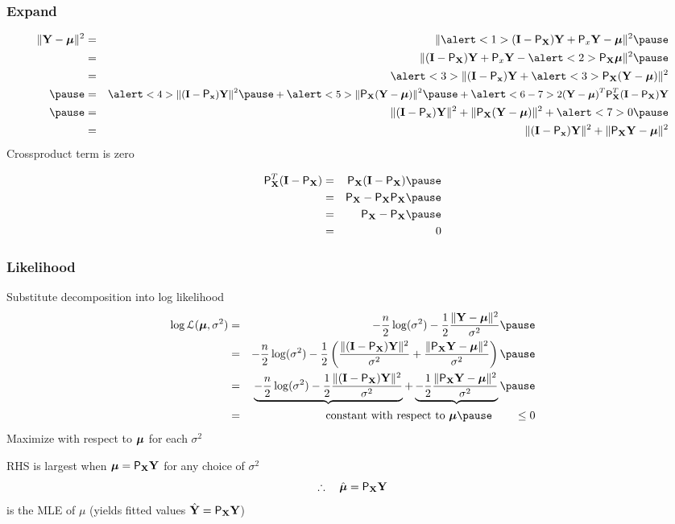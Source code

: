 \documentclass{beamer}
\begin{document}
\begin{frame}
  \frametitle{Expand}

  \begin{eqnarray*}
    \| \Y - \mub \|^2 & = & \|  \alert<1>{ (\I- \P_\X) \Y + \P_x \Y} -
    \mub \|^2 \pause \\
  & = & \| (\I - \P_\X) \Y + \P_x \Y - \alert<2>{\P_\X}\mub \|^2 \pause \\
  & = & \alert<3>{\|(\I -\P_\x)}\Y +  \alert<3>{\P_\X}(\Y  - \mub)
  \|^2 \\\pause 
 & = & \alert<4>{\|(\I -\P_\x)\Y \|^2}\pause +  \alert<5>{\|
   {\P_\X}(\Y  - \mub) \|^2} \pause + \alert<6-7>{\small{2 (\Y -
\mub)^T \P_\X^T (\I - \P_\X) \Y }}\\ \pause 
 & = & \|(\I -\P_\x)\Y \|^2 +  \| {\P_\X}(\Y  - \mub) \|^2 + \alert<7>{0} \pause
 \\
 & = & \|(\I -\P_\x)\Y \|^2 +  \| {\P_\X}\Y  - \mub \|^2  
  \end{eqnarray*}  \pause 
Crossproduct term is zero \pause

\begin{eqnarray*}
  \P_\X^T (\I - \P_\X) & = &  \P_\X (\I - \P_\X) \pause \\
  & = &  \P_\X - \P_\X\P_\X \pause \\ 
 & = &  \P_\X - \P_\X  \pause \\
& = & 0
\end{eqnarray*}
\end{frame}
\begin{frame}
  \frametitle{Likelihood}
Substitute decomposition into log likelihood
\begin{eqnarray*}
 \log \cL(\mub, \sigma^2)  & = &
-\frac{n}{2} \log(\sigma^2) 
  - \frac 1 2 \frac{\| \Y - \mub \|^2}{\sigma^2} \pause \\
  & = & -\frac{n}{2} \log(\sigma^2)  - \frac 1 2 \left( \frac{\|(\I - \P_\X)
  \Y \|^2}{\sigma^2}  
 + \frac{\| \P_\X \Y - \mub\|^2 } {\sigma^2} \right)  \pause \\
 & = &  \underbrace { -\frac{n}{2} \log(\sigma^2)  - \frac 1 2  \frac{\|(\I - \P_\X)
  \Y \|^2}{\sigma^2} }  +  \underbrace{- \frac 1 2  \frac{\| \P_\X \Y -
  \mub\|^2 } {\sigma^2}}  \pause \\
 & = &  \text{ constant with respect to } \mub \pause \qquad  \leq 0 
\end{eqnarray*}   \pause
Maximize with respect to $\boldsymbol{\mu}$ for each $\sigma^2$ \pause

RHS is largest when $\boldsymbol{\mu} = \textsf{P}_{\mathbf{X}} \mathbf{Y}$  for any choice of $\sigma^2$\pause
$$\therefore \quad \hat{\boldsymbol{\mu}} = \textsf{P}_{\mathbf{X}} \mathbf{Y}$$
is the MLE of $\mu$ \pause (yields fitted values $\hat{\mathbf{Y}} = \textsf{P}_{\mathbf{X}} \mathbf{Y}$)
\end{frame}
\end{document}
